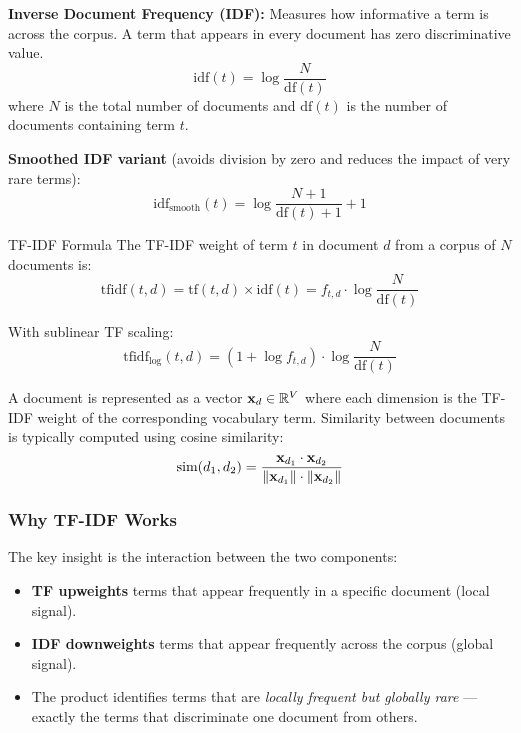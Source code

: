 \textbf{Inverse Document Frequency (IDF):} Measures how informative a term is across
the corpus. A term that appears in every document has zero discriminative value.
\begin{equation}
    \text{idf}(t) = \log \frac{N}{\text{df}(t)}
    \label{eq:idf}
\end{equation}
where $N$ is the total number of documents and $\text{df}(t)$ is the number of documents
containing term $t$.

\textbf{Smoothed IDF variant} (avoids division by zero and reduces the impact of very
rare terms):
\begin{equation}
    \text{idf}_{\text{smooth}}(t) = \log \frac{N + 1}{\text{df}(t) + 1} + 1
    \label{eq:idf_smooth}
\end{equation}

\begin{mathresult}{TF-IDF Formula}
The TF-IDF weight of term $t$ in document $d$ from a corpus of $N$ documents is:
\begin{equation}
    \text{tfidf}(t, d) = \text{tf}(t, d) \times \text{idf}(t) = f_{t,d} \cdot \log \frac{N}{\text{df}(t)}
    \label{eq:tfidf}
\end{equation}

With sublinear TF scaling:
\begin{equation}
    \text{tfidf}_{\log}(t, d) = (1 + \log f_{t,d}) \cdot \log \frac{N}{\text{df}(t)}
    \label{eq:tfidf_sublinear}
\end{equation}

A document is represented as a vector $\mathbf{x}_d \in \mathbb{R}^V$ where each dimension is the
TF-IDF weight of the corresponding vocabulary term. Similarity between documents is
typically computed using cosine similarity:
\begin{equation}
    \text{sim}(d_1, d_2) = \frac{\mathbf{x}_{d_1} \cdot \mathbf{x}_{d_2}}{\left\lVert\mathbf{x}_{d_1}\right\rVert \cdot \left\lVert\mathbf{x}_{d_2}\right\rVert}
\end{equation}
\end{mathresult}

\subsubsection{Why TF-IDF Works}

The key insight is the interaction between the two components:

\begin{itemize}
    \item \textbf{TF upweights} terms that appear frequently in a specific document
    (local signal).
    \item \textbf{IDF downweights} terms that appear frequently across the corpus
    (global signal).
    \item The product identifies terms that are \emph{locally frequent but globally rare}
    ---exactly the terms that discriminate one document from others.
\end{itemize}

